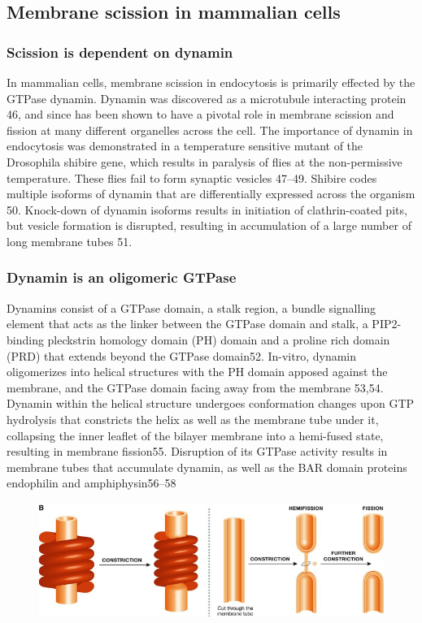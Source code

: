		
\subsection{Membrane scission in mammalian cells}
		\subsubsection{Scission is dependent on dynamin} 
		In mammalian cells, membrane scission in endocytosis is primarily effected by the GTPase dynamin. Dynamin was discovered as a microtubule interacting protein 46, and since has been shown to have a pivotal role in membrane scission and fission at many different organelles across the cell. The importance of dynamin in endocytosis was demonstrated in a temperature sensitive mutant of the Drosophila shibire gene, which results in paralysis of flies at the non-permissive temperature. These flies fail to form synaptic vesicles 47–49. Shibire codes multiple isoforms of dynamin that are differentially expressed across the organism 50. Knock-down of dynamin isoforms results in initiation of clathrin-coated pits, but vesicle formation is disrupted, resulting in accumulation of a large number of long membrane tubes 51. 

		 
		\subsubsection{Dynamin is an oligomeric GTPase}
		Dynamins consist of a GTPase domain, a stalk region, a bundle signalling element that acts as the linker between the GTPase domain and stalk, a PIP2-binding pleckstrin homology domain (PH) domain and a proline rich domain (PRD) that extends beyond the GTPase domain52. In-vitro, dynamin oligomerizes into helical structures with the PH domain apposed against the membrane, and the GTPase domain facing away from the membrane 53,54. Dynamin within the helical structure undergoes conformation changes upon GTP hydrolysis that constricts the helix as well as the membrane tube under it, collapsing the inner leaflet of the bilayer membrane into a hemi-fused state, resulting in membrane fission55. Disruption of its GTPase activity results in membrane tubes that accumulate dynamin, as well as the BAR domain proteins endophilin and amphiphysin56–58
		
		\begin{figure}[H]
			\centering
			\includegraphics[scale=0.5]{figures/intro/dynamin_2}
		\end{figure}

